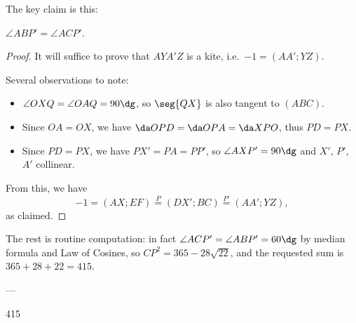 The key claim is this:
\begin{claim*}
    $\angle ABP'=\angle ACP'$.
\end{claim*}
\begin{proof}
    It will suffice to prove that $AYA'Z$ is a kite, i.e.\ $-1=(AA';YZ)$.

    Several observations to note:
    \begin{itemize}[itemsep=0em]
        \item $\angle OXQ=\angle OAQ=90\dg$, so $\seg{QX}$ is also tangent to $(ABC)$.
        \item Since $OA=OX$, we have $\da OPD=\da OPA=\da XPO$, thus $PD=PX$.
        \item Since $PD=PX$, we have $PX'=PA=PP'$, so $\angle AXP'=90\dg$ and $X'$, $P'$, $A'$ collinear.
    \end{itemize}
    From this, we have \[-1=(AX;EF)\stackrel P=(DX';BC)\stackrel{P'}=(AA';YZ),\]
    as claimed.
\end{proof}

The rest is routine computation: in fact $\angle ACP'=\angle ABP'=60\dg$ by median formula and Law of Cosines, so $CP^2=365-28\sqrt{22}$, and the requested sum is $365+28+22=415$.

---

415
